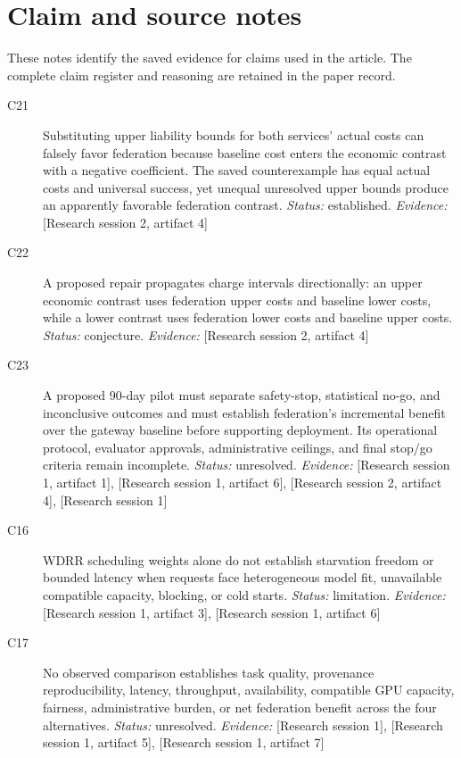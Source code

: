 \documentclass[11pt]{article}
\begin{document}
\appendix
\section{Claim and source notes}
These notes identify the saved evidence for claims used in the article. The complete claim register and reasoning are retained in the paper record.
\begin{sloppypar}
\small
\begin{description}
\item[C21] Substituting upper liability bounds for both services' actual costs can falsely favor federation because baseline cost enters the economic contrast with a negative coefficient. The saved counterexample has equal actual costs and universal success, yet unequal unresolved upper bounds produce an apparently favorable federation contrast. \textit{Status: }established.
\textit{Evidence: }[Research session 2, artifact 4]
\item[C22] A proposed repair propagates charge intervals directionally: an upper economic contrast uses federation upper costs and baseline lower costs, while a lower contrast uses federation lower costs and baseline upper costs. \textit{Status: }conjecture.
\textit{Evidence: }[Research session 2, artifact 4]
\item[C23] A proposed 90-day pilot must separate safety-stop, statistical no-go, and inconclusive outcomes and must establish federation's incremental benefit over the gateway baseline before supporting deployment. Its operational protocol, evaluator approvals, administrative ceilings, and final stop/go criteria remain incomplete. \textit{Status: }unresolved.
\textit{Evidence: }[Research session 1, artifact 1], [Research session 1, artifact 6], [Research session 2, artifact 4], [Research session 1]
\item[C16] WDRR scheduling weights alone do not establish starvation freedom or bounded latency when requests face heterogeneous model fit, unavailable compatible capacity, blocking, or cold starts. \textit{Status: }limitation.
\textit{Evidence: }[Research session 1, artifact 3], [Research session 1, artifact 6]
\item[C17] No observed comparison establishes task quality, provenance reproducibility, latency, throughput, availability, compatible GPU capacity, fairness, administrative burden, or net federation benefit across the four alternatives. \textit{Status: }unresolved.
\textit{Evidence: }[Research session 1], [Research session 1, artifact 5], [Research session 1, artifact 7]

\end{description}
\end{sloppypar}
\end{document}
